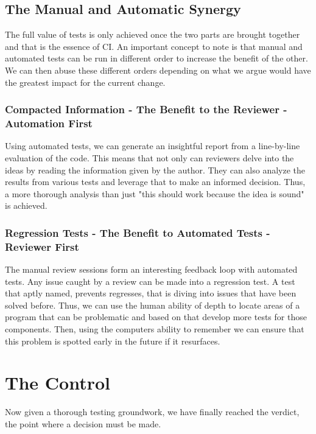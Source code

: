 \documentclass{article}
\begin{document}
\subsection{The Manual and Automatic Synergy}

The full value of tests is only achieved once the two parts are brought together and that is the essence of CI. 
An important concept to note is that manual and automated tests can be run in different order to increase the benefit of the other.
We can then abuse these different orders depending on what we argue would have the greatest impact for the current change.

\subsubsection{Compacted Information - The Benefit to the Reviewer - Automation First}

Using automated tests, we can generate an insightful report from a line-by-line evaluation of the code.
This means that not only can reviewers delve into the ideas by reading the information given by the author. 
They can also analyze the results from various tests and leverage that to make an informed decision.
Thus, a more thorough analysis than just "this should work because the idea is sound" is achieved.

\subsubsection{Regression Tests - The Benefit to Automated Tests - Reviewer First}

The manual review sessions form an interesting feedback loop with automated tests. 
Any issue caught by a review can be made into a regression test.
A test that aptly named, prevents regresses, that is diving into issues that have been solved before.
Thus, we can use the human ability of depth to locate areas of a program that can be problematic and based on that develop more tests for those components.
Then, using the computers ability to remember we can ensure that this problem is spotted early in the future if it resurfaces.


\section{The Control}

Now given a thorough testing groundwork, we have finally reached the verdict, the point where a decision must be made. 
\end{document}
